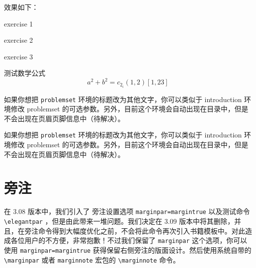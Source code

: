 效果如下：
\begin{problemset}
  \item exercise 1
  \item exercise 2
  \item exercise 3
  \item 测试数学公式
  \begin{equation}
    a^2+b^2=c_{2_{i}} (1,2) [1,23]
  \end{equation}
\end{problemset}

\begin{remark}
如果你想把 \lstinline{problemset} 环境的标题改为其他文字，你可以类似于 introduction 环境修改 problemset 的可选参数。另外，目前这个环境会自动出现在目录中，但是不会出现在页眉页脚信息中（待解决）。
\end{remark}

\begin{solution}
如果你想把 \lstinline{problemset} 环境的标题改为其他文字，你可以类似于 introduction 环境修改 problemset 的可选参数。另外，目前这个环境会自动出现在目录中，但是不会出现在页眉页脚信息中（待解决）。
\end{solution}

\section{旁注}

在 3.08 版本中，我们引入了 旁注设置选项 \lstinline{marginpar=margintrue} 以及测试命令 \lstinline{\elegantpar} ，但是由此带来一堆问题。我们决定在 3.09 版本中将其删除，并且，在旁注命令得到大幅度优化之前，不会将此命令再次引入书籍模板中。对此造成各位用户的不方便，非常抱歉！不过我们保留了 \lstinline{marginpar} 这个选项，你可以使用 \lstinline{marginpar=margintrue} 获得保留右侧旁注的版面设计。然后使用系统自带的 \lstinline{\marginpar} 或者 \lstinline{marginnote} 宏包的 \lstinline{\marginnote} 命令。


